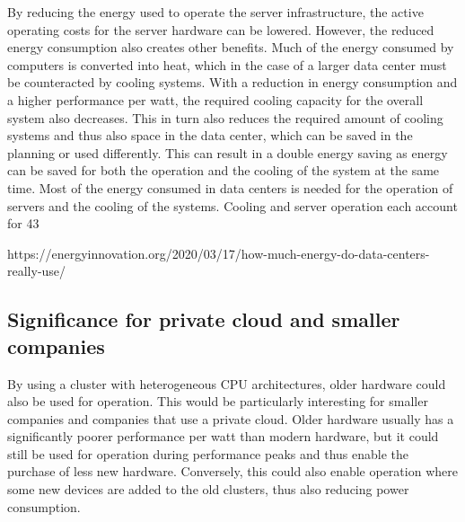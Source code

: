 By reducing the energy used to operate the server infrastructure, the active
operating costs for the server hardware can be lowered. However, the reduced
energy consumption also creates other benefits. Much of the energy consumed by
computers is converted into heat, which in the case of a larger data center
must be counteracted by cooling systems. With a reduction in energy consumption
and a higher performance per watt, the required cooling capacity for the
overall system also decreases. This in turn also reduces the required amount of
cooling systems and thus also space in the data center, which can be saved in
the planning or used differently. This can result in a double energy saving as
energy can be saved for both the operation and the cooling of the system at the
same time.
Most of the energy consumed in data centers is needed for the operation of servers and the cooling of the systems. Cooling and server operation each account for 43%

https://energyinnovation.org/2020/03/17/how-much-energy-do-data-centers-really-use/

\subsection{Significance for private cloud and smaller companies}
By using a cluster with heterogeneous CPU architectures, older hardware could
also be used for operation. This would be particularly interesting for smaller
companies and companies that use a private cloud. Older hardware usually has a
significantly poorer performance per watt than modern hardware, but it could
still be used for operation during performance peaks and thus enable the
purchase of less new hardware.  Conversely, this could also enable operation
where some new devices are added to the old clusters, thus also reducing power
consumption.
